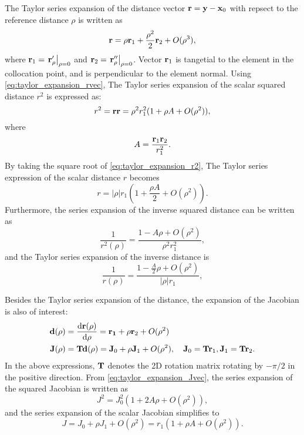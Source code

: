 The Taylor series expansion of the distance vector ${\bf r} = {\bf y} - {\bf x}_0$ with repsect to the reference distance $\rho$ is written as
%
\begin{equation}
	{\bf r} = \rho {\bf r}_1 + \frac{\rho^2}{2} {\bf r}_2 + O(\rho^3)
	\label{eq:taylor_expansion_rvec}
	,
\end{equation}
%
where ${\bf r}_1 = \left.{\bf r}'_{\rho}\right|_{\rho = 0}$ and ${\bf r}_2 = \left.{\bf r}''_{\rho}\right|_{\rho = 0}$. 
Vector ${\bf r}_1$ is tangetial to the element in the collocation point, and is perpendicular to the element normal.
Using \eqref{eq:taylor_expansion_rvec}, The Taylor series expansion of the scalar squared distance $r^2$ is expressed as:
%
\begin{equation}
	r^2 = {\bf r} {\bf r} = \rho^2 r_1^2 (1 + \rho A + O(\rho^2))
	\label{eq:taylor_expansion_r2}
	,
\end{equation}
%
where
%
\begin{equation}
	A = \frac{{\bf r}_1 {\bf r}_2}{r_1^2}
	.
\end{equation}
%
By taking the square root of \eqref{eq:taylor_expansion_r2}, The Taylor series expression of the scalar distance $r$ becomes
%
\begin{equation}
	r = |\rho| r_1 \left(1 + \frac{\rho A}{2} + O(\rho^2)\right)
	.
	\label{eq:taylor_expansion_r}
\end{equation}
%
Furthermore, the series expansion of the inverse squared distance can be written as
%
\begin{equation}
	\frac{1}{r^2(\rho)} = \frac{1 - A \rho + O(\rho^2)}{\rho^2 r_1^2}
	,
	\label{eq:taylor_expansion_rmin2}
\end{equation}
%
and the Taylor series expansion of the inverse distance is
%
\begin{equation}
	\frac{1}{r(\rho)} = \frac{1 - \frac{A}{2} \rho + O(\rho^2)}{|\rho| r_1}
	,
	\label{eq:taylor_expansion_rmin1}
\end{equation}

Besides the Taylor series expansion of the distance, the expansion of the Jacobian is also of interest:
%
\begin{align}
	{\bf d}(\rho) &= \frac{\mathrm{d} {\bf r}(\rho)}{\mathrm{d} \rho} = {\bf r_1} + \rho {\bf r}_2 + O(\rho^2)\\
	{\bf J}(\rho) &= {\bf T} {\bf d}(\rho) = {\bf J}_0 + \rho {\bf J}_1 + O(\rho^2), \quad {\bf J}_0 = {\bf T} {\bf r}_1, {\bf J}_1 = {\bf T} {\bf r}_2
	.
	\label{eq:taylor_expansion_Jvec}
\end{align}
%
In the above expressions, ${\bf T}$ denotes the 2D rotation matrix rotating by $-\pi/2$ in the positive direction.
From \eqref{eq:taylor_expansion_Jvec}, the series expansion of the squared Jacobian is written as
%
\begin{equation}
	J^2 = J_0^2\left(1 + 2 A \rho + O(\rho^2)\right)
	,
	\label{eq:taylor_expansion_J2}
\end{equation}
%
and the series expansion of the scalar Jacobian simplifies to
%
\begin{equation}
	J = J_0 + \rho J_1 + O(\rho^2)
	= r_1\left(1 + \rho A  + O(\rho^2)\right)
	.
	\label{eq:taylor_expansion_J}
\end{equation}


